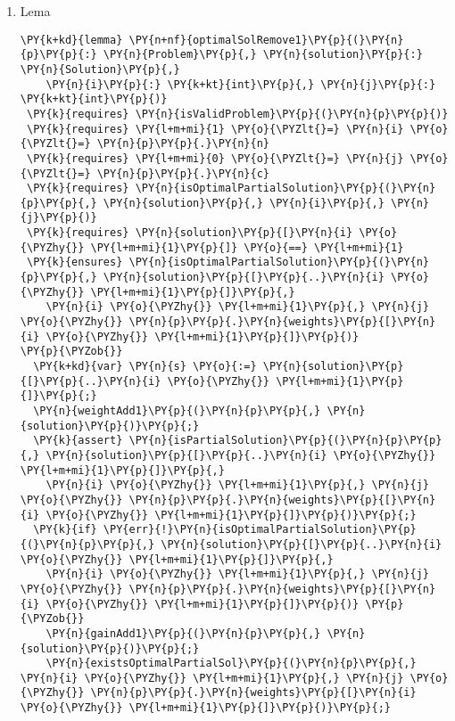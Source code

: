\begin{sloppypar}
\begin{enumerate}
     \item Lema 
     \begin{Verbatim}[commandchars=\\\{\}]
\PY{k+kd}{lemma} \PY{n+nf}{optimalSolRemove1}\PY{p}{(}\PY{n}{p}\PY{p}{:} \PY{n}{Problem}\PY{p}{,} \PY{n}{solution}\PY{p}{:} \PY{n}{Solution}\PY{p}{,} 
    \PY{n}{i}\PY{p}{:} \PY{k+kt}{int}\PY{p}{,} \PY{n}{j}\PY{p}{:} \PY{k+kt}{int}\PY{p}{)}
 \PY{k}{requires} \PY{n}{isValidProblem}\PY{p}{(}\PY{n}{p}\PY{p}{)}
 \PY{k}{requires} \PY{l+m+mi}{1} \PY{o}{\PYZlt{}=} \PY{n}{i} \PY{o}{\PYZlt{}=} \PY{n}{p}\PY{p}{.}\PY{n}{n}
 \PY{k}{requires} \PY{l+m+mi}{0} \PY{o}{\PYZlt{}=} \PY{n}{j} \PY{o}{\PYZlt{}=} \PY{n}{p}\PY{p}{.}\PY{n}{c}
 \PY{k}{requires} \PY{n}{isOptimalPartialSolution}\PY{p}{(}\PY{n}{p}\PY{p}{,} \PY{n}{solution}\PY{p}{,} \PY{n}{i}\PY{p}{,} \PY{n}{j}\PY{p}{)}
 \PY{k}{requires} \PY{n}{solution}\PY{p}{[}\PY{n}{i} \PY{o}{\PYZhy{}} \PY{l+m+mi}{1}\PY{p}{]} \PY{o}{==} \PY{l+m+mi}{1}
 \PY{k}{ensures} \PY{n}{isOptimalPartialSolution}\PY{p}{(}\PY{n}{p}\PY{p}{,} \PY{n}{solution}\PY{p}{[}\PY{p}{..}\PY{n}{i} \PY{o}{\PYZhy{}} \PY{l+m+mi}{1}\PY{p}{]}\PY{p}{,} 
    \PY{n}{i} \PY{o}{\PYZhy{}} \PY{l+m+mi}{1}\PY{p}{,} \PY{n}{j} \PY{o}{\PYZhy{}} \PY{n}{p}\PY{p}{.}\PY{n}{weights}\PY{p}{[}\PY{n}{i} \PY{o}{\PYZhy{}} \PY{l+m+mi}{1}\PY{p}{]}\PY{p}{)}
\PY{p}{\PYZob{}}
  \PY{k+kd}{var} \PY{n}{s} \PY{o}{:=} \PY{n}{solution}\PY{p}{[}\PY{p}{..}\PY{n}{i} \PY{o}{\PYZhy{}} \PY{l+m+mi}{1}\PY{p}{]}\PY{p}{;}
  \PY{n}{weightAdd1}\PY{p}{(}\PY{n}{p}\PY{p}{,} \PY{n}{solution}\PY{p}{)}\PY{p}{;}
  \PY{k}{assert} \PY{n}{isPartialSolution}\PY{p}{(}\PY{n}{p}\PY{p}{,} \PY{n}{solution}\PY{p}{[}\PY{p}{..}\PY{n}{i} \PY{o}{\PYZhy{}} \PY{l+m+mi}{1}\PY{p}{]}\PY{p}{,} 
    \PY{n}{i} \PY{o}{\PYZhy{}} \PY{l+m+mi}{1}\PY{p}{,} \PY{n}{j} \PY{o}{\PYZhy{}} \PY{n}{p}\PY{p}{.}\PY{n}{weights}\PY{p}{[}\PY{n}{i} \PY{o}{\PYZhy{}} \PY{l+m+mi}{1}\PY{p}{]}\PY{p}{)}\PY{p}{;}
  \PY{k}{if} \PY{err}{!}\PY{n}{isOptimalPartialSolution}\PY{p}{(}\PY{n}{p}\PY{p}{,} \PY{n}{solution}\PY{p}{[}\PY{p}{..}\PY{n}{i} \PY{o}{\PYZhy{}} \PY{l+m+mi}{1}\PY{p}{]}\PY{p}{,} 
    \PY{n}{i} \PY{o}{\PYZhy{}} \PY{l+m+mi}{1}\PY{p}{,} \PY{n}{j} \PY{o}{\PYZhy{}} \PY{n}{p}\PY{p}{.}\PY{n}{weights}\PY{p}{[}\PY{n}{i} \PY{o}{\PYZhy{}} \PY{l+m+mi}{1}\PY{p}{]}\PY{p}{)} \PY{p}{\PYZob{}}
    \PY{n}{gainAdd1}\PY{p}{(}\PY{n}{p}\PY{p}{,} \PY{n}{solution}\PY{p}{)}\PY{p}{;}
    \PY{n}{existsOptimalPartialSol}\PY{p}{(}\PY{n}{p}\PY{p}{,} \PY{n}{i} \PY{o}{\PYZhy{}} \PY{l+m+mi}{1}\PY{p}{,} \PY{n}{j} \PY{o}{\PYZhy{}} \PY{n}{p}\PY{p}{.}\PY{n}{weights}\PY{p}{[}\PY{n}{i} \PY{o}{\PYZhy{}} \PY{l+m+mi}{1}\PY{p}{]}\PY{p}{)}\PY{p}{;}

\end{Verbatim}
\end{enumerate}
\end{sloppypar}
